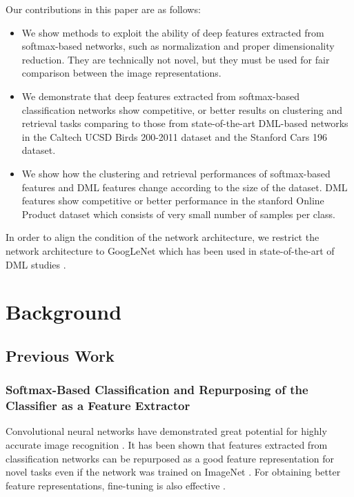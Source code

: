 \documentclass[9pt,technote,compsoc]{./sty/IEEEtran}
\begin{document}
Our contributions in this paper are as follows:
\begin{itemize}
	\item We show methods to exploit the ability of deep features extracted from softmax-based networks, such as normalization and proper dimensionality reduction. They are technically not novel, but they must be used for fair comparison between the image representations.
	\item We demonstrate that deep features extracted from softmax-based classification networks show competitive, or better results on clustering and retrieval tasks comparing to those from state-of-the-art DML-based networks \cite{song2016deep,sohn2016improved,song2017learnable} in the Caltech UCSD Birds 200-2011 dataset and the Stanford Cars 196 dataset.
	\item We show how the clustering and retrieval performances of softmax-based features and DML features change according to the size of the dataset. DML features show competitive or better
performance in the stanford Online Product dataset which consists of very small number of samples
per class.
\end{itemize}

In order to align the condition of the network architecture, we restrict the network architecture to GoogLeNet \cite{szegedy2015going} which has been used in state-of-the-art of DML studies \cite{song2016deep,sohn2016improved,song2017learnable}.



\section{Background}
\subsection{Previous Work}
\subsubsection{Softmax-Based Classification and Repurposing of the Classifier as a Feature Extractor}
Convolutional neural networks have demonstrated great potential for highly accurate image recognition \cite{krizhevsky2012imagenet}\cite{simonyan2015very}\cite{szegedy2015going}\cite{he2016deep}.
It has been shown that features extracted from classification networks can be repurposed as a good feature representation for novel tasks \cite{donahue2014decaf}\cite{razavian2014cnn}\cite{qian2015fine} even if the network was trained on ImageNet \cite{russakovsky2015imagenet}.
For obtaining better feature representations, fine-tuning is also effective \cite{babenko2014neural}.
\end{document}
